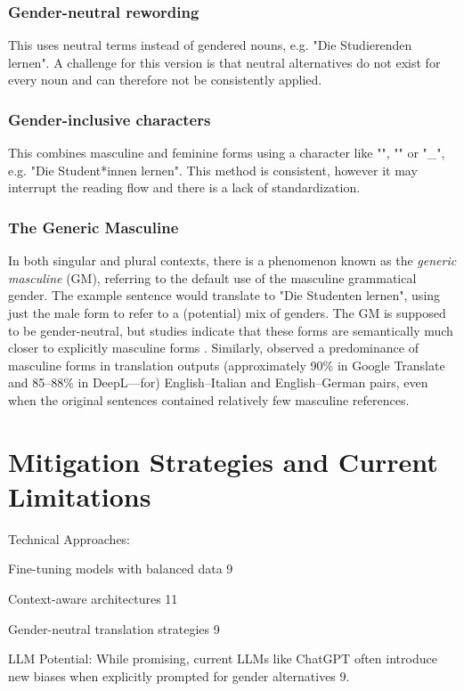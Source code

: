 \subsubsection{Gender-neutral rewording}
This uses neutral terms instead of gendered nouns, e.g. "Die Studierenden lernen". A challenge for this version is that neutral alternatives do not exist for every noun and can therefore not be consistently applied.

\subsubsection{Gender-inclusive characters} 
This combines masculine and feminine forms using a character like "\*", "\:" or "\_", e.g. "Die Student*innen lernen". This method is consistent, however it may interrupt the reading flow and there is a lack of standardization. 

\subsubsection{The Generic Masculine}
In both singular and plural contexts, there is a phenomenon known as the \textit{generic masculine} (GM), referring to the default use of the masculine grammatical gender. The example sentence would translate to "Die Studenten lernen", using just the male form to refer to a (potential) mix of genders. The GM is supposed to be gender-neutral, but studies indicate that these forms are semantically much closer to explicitly masculine forms \citep{schmitzGermanAllProfessors2022}. Similarly, \citet{rescignoGenderBiasMachine2023} observed a predominance of masculine forms in translation outputs (approximately 90\% in Google Translate and 85–88\% in DeepL—for) English–Italian and English–German pairs, even when the original sentences contained relatively few masculine references.
    


\section{Mitigation Strategies and Current Limitations}    
Technical Approaches:

Fine-tuning models with balanced data 9

Context-aware architectures 11

Gender-neutral translation strategies 9

LLM Potential: While promising, current LLMs like ChatGPT often introduce new biases when explicitly prompted for gender alternatives 9.

